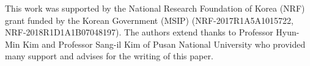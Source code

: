%


\begin{acknowledgements}
This work was supported by the National Research Foundation of Korea (NRF)
grant funded by the Korean Government (MSIP) (NRF-2017R1A5A1015722, NRF-2018R1D1A1B07048197). 
The authors extend thanks to Professor Hyun-Min Kim and Professor Sang-il Kim of Pusan National University who provided many support and advises for the writing of this paper.
\end{acknowledgements}


